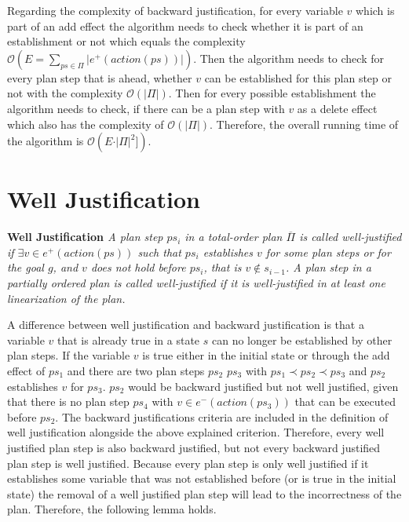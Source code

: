 Regarding the complexity of backward justification, for every variable $v$ which is part of an add effect 
the algorithm needs to check whether it is part of an establishment or not which equals the complexity $\mathcal{O}(E=\sum_{ps \in \Pi} \vert e^+(action(ps))\vert)$.
Then the algorithm needs to check for every plan step that is ahead, whether $v$ can be established for this plan step or not with the complexity $\mathcal{O}(\vert \Pi \vert)$.
Then for every possible establishment the algorithm needs to check, if there can be a plan step with $v$ as a delete effect which also has the complexity of $\mathcal{O}(\vert \Pi \vert)$.
Therefore, the overall running time of the algorithm is $\mathcal{O}(E\cdot\vert \Pi \vert ^{2}] )$.
\section{Well Justification}

\begin{Definition}
    \normalfont \textbf{Well Justification \cite{Justification}}
    \textit{A plan step $ps_i$ in a total-order plan $\overline{\Pi}$ is called well-justified if $\exists v \in e^+(action(ps))$
such that $ps_i$ establishes $v$ for some plan steps or
for the goal $g$, and $v$ does not hold before $ps_i$, that is
$v \notin s_{i-1}$. A plan step in a partially ordered plan is called well-justified if it is 
well-justified in at least one linearization of the plan.
}
\end{Definition}
A difference between well justification and backward justification is that a variable $v$ that is already true in a state $s$ 
can no longer be established by other plan steps. If the variable $v$ is true either in the initial state or through the add effect of $ps_1$ 
and there are two plan steps $ps_2$ $ps_3$ with $ps_1 \prec ps_2 \prec ps_3$ and $ps_2$ establishes $v$ for $ps_3$. $ps_2$ would be backward justified but not 
well justified, given that there is no plan step $ps_4$ with $v \in e^-(action(ps_3))$ that can be executed before $ps_2$.
The backward justifications criteria are included in the definition of well justification alongside the above explained criterion.
Therefore, every well justified plan step is also backward justified, but not every backward justified plan step is 
well justified.
Because every plan step is only well justified if it establishes some variable that was not established before (or is true in the initial state) the
removal of a well justified plan step will lead to the incorrectness of the plan. Therefore, the following lemma holds.

